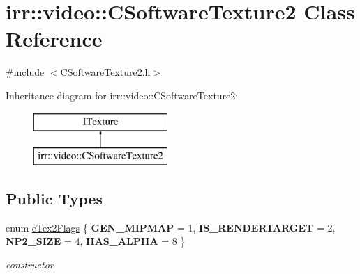 \hypertarget{classirr_1_1video_1_1_c_software_texture2}{\section{irr\-:\-:video\-:\-:C\-Software\-Texture2 Class Reference}
\label{classirr_1_1video_1_1_c_software_texture2}
}


{\ttfamily \#include $<$C\-Software\-Texture2.\-h$>$}

Inheritance diagram for irr\-:\-:video\-:\-:C\-Software\-Texture2\-:\begin{figure}[H]
\begin{center}
\leavevmode
\includegraphics[height=2.000000cm]{classirr_1_1video_1_1_c_software_texture2}
\end{center}
\end{figure}
\subsection*{Public Types}
\begin{DoxyCompactItemize}
\item 
enum \hyperlink{classirr_1_1video_1_1_c_software_texture2_a998d86341a2ecbddfd9b6b1891692ea5}{e\-Tex2\-Flags} \{ {\bfseries G\-E\-N\-\_\-\-M\-I\-P\-M\-A\-P} = 1, 
{\bfseries I\-S\-\_\-\-R\-E\-N\-D\-E\-R\-T\-A\-R\-G\-E\-T} = 2, 
{\bfseries N\-P2\-\_\-\-S\-I\-Z\-E} = 4, 
{\bfseries H\-A\-S\-\_\-\-A\-L\-P\-H\-A} = 8
 \}
\begin{DoxyCompactList}\small\item\em constructor \end{DoxyCompactList}\end{DoxyCompactItemize}
